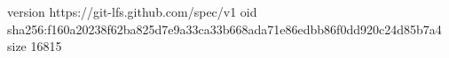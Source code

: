 version https://git-lfs.github.com/spec/v1
oid sha256:f160a20238f62ba825d7e9a33ca33b668ada71e86edbb86f0dd920c24d85b7a4
size 16815
